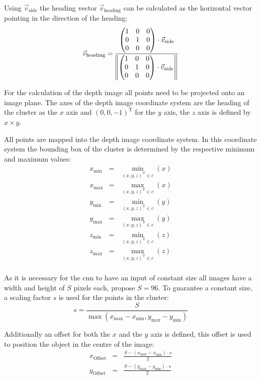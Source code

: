 Using $\vec{v}_\text{side}$ the heading vector $\vec{v}_\text{heading}$ can be calculated as the horizontal vector pointing in the direction of the heading:
\begin{equation}
    \vec{v}_\text{heading} =
        \normalize{
            \begin{pmatrix}
                1 & 0 & 0 \\
                0 & 1 & 0 \\
                0 & 0 & 0
            \end{pmatrix}
            \cdot \vec{v}_\text{side}
        }
\end{equation}

For the calculation of the depth image all points need to be projected onto an image plane.
The axes of the depth image coordinate system are the heading of the cluster as the $x$ axis and ${(0,0,-1)}^\text{T}$ for the $y$ axis, the $z$ axis is defined by $x \times y$.

All points are mapped into the depth image coordinate system. In this coordinate system the bounding box of the cluster is determined by the respective minimum and maximum values:
\begin{eqnarray}
    x_\text{min} &=& \min_{{(x,y,z)}^\text{T} \in c}(x) \label{eqn:det:minx} \\ 
    x_\text{max} &=& \max_{{(x,y,z)}^\text{T} \in c}(x) \\
    y_\text{min} &=& \min_{{(x,y,z)}^\text{T} \in c}(y) \\
    y_\text{max} &=& \max_{{(x,y,z)}^\text{T} \in c}(y) \label{eqn:det:maxy} \\
    z_\text{min} &=& \min_{{(x,y,z)}^\text{T} \in c}(z) \label{eqn:det:minz} \\
    z_\text{max} &=& \max_{{(x,y,z)}^\text{T} \in c}(z) \label{eqn:det:maxz} \\
\end{eqnarray}

As it is necessary for the \ac{cnn} to have an input of constant size all images have a width and height of $S$ pixels each, \cite{AttBen17} propose $S=96$. To guarantee a constant size, a scaling factor $s$ is used for the points in the cluster:
\begin{equation}
    s = \frac{S}{\max(x_\text{max} - x_\text{min}, y_\text{max} - y_\text{min})}
\end{equation}

Additionally an offset for both the $x$ and the $y$ axis is defined, this offset is used to position the object in the centre of the image:
\begin{eqnarray}
    x_\text{Offset} &=& \frac{S - (x_\text{max} - x_\text{min}) \cdot s}{2} \\
    y_\text{Offset} &=& \frac{S - (y_\text{max} - y_\text{min}) \cdot s}{2}
\end{eqnarray}

